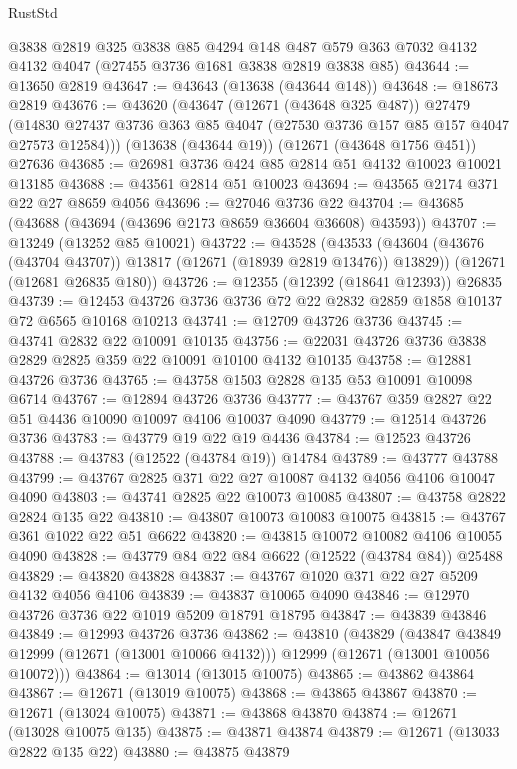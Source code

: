 \begin{lexlean}{RustStd}
\begin{coremodule}
    @3838
    @2819
    @325
    @3838
    @85
    @4294
    @148
    @487
    @579
    @363
    @7032
    @4132
    @4132
    @4047
    (@27455 @3736 @1681 @3838 @2819 @3838 @85)
@43644 := @13650 @2819
@43647 := @43643 (@13638 (@43644 @148))
@43648 := @18673 @2819
@43676 := @43620
    (@43647
      (@12671 (@43648 @325 @487))
      @27479
      (@14830 @27437 @3736 @363 @85 @4047 (@27530 @3736 @157 @85 @157 @4047 @27573 @12584)))
    (@13638 (@43644 @19))
    (@12671 (@43648 @1756 @451))
    @27636
@43685 := @26981 @3736 @424 @85 @2814 @51 @4132 @10023 @10021 @13185
@43688 := @43561 @2814 @51 @10023
@43694 := @43565 @2174 @371 @22 @27 @8659 @4056
@43696 := @27046 @3736 @22
@43704 := @43685 (@43688 (@43694 (@43696 @2173 @8659 @36604 @36608) @43593))
@43707 := @13249 (@13252 @85 @10021)
@43722 := @43528
    (@43533 (@43604 (@43676 (@43704 @43707)) @13817 (@12671 (@18939 @2819 @13476)) @13829))
    (@12671 (@12681 @26835 @180))
@43726 := @12355 (@12392 (@18641 @12393)) @26835
@43739 := @12453 @43726 @3736 @3736 @72 @22 @2832 @2859 @1858 @10137 @72 @6565 @10168 @10213
@43741 := @12709 @43726 @3736
@43745 := @43741 @2832 @22 @10091 @10135
@43756 := @22031 @43726 @3736 @3838 @2829 @2825 @359 @22 @10091 @10100 @4132 @10135
@43758 := @12881 @43726 @3736
@43765 := @43758 @1503 @2828 @135 @53 @10091 @10098 @6714
@43767 := @12894 @43726 @3736
@43777 := @43767 @359 @2827 @22 @51 @4436 @10090 @10097 @4106 @10037 @4090
@43779 := @12514 @43726 @3736
@43783 := @43779 @19 @22 @19 @4436
@43784 := @12523 @43726
@43788 := @43783 (@12522 (@43784 @19)) @14784
@43789 := @43777 @43788
@43799 := @43767 @2825 @371 @22 @27 @10087 @4132 @4056 @4106 @10047 @4090
@43803 := @43741 @2825 @22 @10073 @10085
@43807 := @43758 @2822 @2824 @135 @22
@43810 := @43807 @10073 @10083 @10075
@43815 := @43767 @361 @1022 @22 @51 @6622
@43820 := @43815 @10072 @10082 @4106 @10055 @4090
@43828 := @43779 @84 @22 @84 @6622 (@12522 (@43784 @84)) @25488
@43829 := @43820 @43828
@43837 := @43767 @1020 @371 @22 @27 @5209 @4132 @4056 @4106
@43839 := @43837 @10065 @4090
@43846 := @12970 @43726 @3736 @22 @1019 @5209 @18791 @18795
@43847 := @43839 @43846
@43849 := @12993 @43726 @3736
@43862 := @43810
    (@43829
      (@43847 @43849 @12999 (@12671 (@13001 @10066 @4132)))
      @12999
      (@12671 (@13001 @10056 @10072)))
@43864 := @13014 (@13015 @10075)
@43865 := @43862 @43864
@43867 := @12671 (@13019 @10075)
@43868 := @43865 @43867
@43870 := @12671 (@13024 @10075)
@43871 := @43868 @43870
@43874 := @12671 (@13028 @10075 @135)
@43875 := @43871 @43874
@43879 := @12671 (@13033 @2822 @135 @22)
@43880 := @43875 @43879

\end{coremodule}
\end{lexlean}
